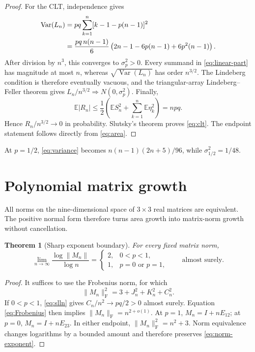 \documentclass[11pt,a4paper]{amsart}
\newtheorem{theorem}{Theorem}[section]
\theoremstyle{definition}
\theoremstyle{remark}
\newcommand{\Exp}{\mathbb E}
\newcommand{\norm}[1]{\lVert #1\rVert}
\begin{document}
\begin{proof}
For the CLT, independence gives
\begin{align}
 \operatorname{Var}(L_n)
 &=pq\sum_{k=1}^n[k-1-p(n-1)]^2\notag\\
 &=\frac{pq\,n(n-1)}6
 \left(2n-1-6p(n-1)+6p^2(n-1)\right).
 \label{eq:linear-variance}
\end{align}
After division by $n^3$, this converges to $\sigma_p^2>0$.  Every summand
in \eqref{eq:linear-part} has magnitude at most $n$, whereas
$\sqrt{\operatorname{Var}(L_n)}$ has order $n^{3/2}$.  The Lindeberg
condition is therefore eventually vacuous, and the triangular-array
Lindeberg--Feller theorem gives
$L_n/n^{3/2}\Longrightarrow N(0,\sigma_p^2)$.
Finally,
\[
 \Exp|R_n|
 \leq\frac12\left(
 \Exp S_n^2+\sum_{k=1}^n\Exp\eta_k^2\right)=npq.
\]
Hence $R_n/n^{3/2}\to0$ in probability.  Slutsky's theorem proves
\eqref{eq:clt}.  The endpoint statement follows directly from
\eqref{eq:area}.
\end{proof}

At $p=1/2$, \eqref{eq:variance} becomes
$n(n-1)(2n+5)/96$, while $\sigma_{1/2}^2=1/48$.

\section{Polynomial matrix growth}
\label{sec:growth}

All norms on the nine-dimensional space of $3\times3$ real matrices are
equivalent.  The positive normal form therefore turns area growth into
matrix-norm growth without cancellation.

\begin{theorem}[Sharp exponent boundary]
\label{thm:norm-boundary}
For every fixed matrix norm,
\begin{equation}\label{eq:norm-exponent}
 \lim_{n\to\infty}\frac{\log\norm{M_n}}{\log n}
 =\begin{cases}
 2,&0<p<1,\\
 1,&p=0\text{ or }p=1,
 \end{cases}
 \qquad\text{almost surely}.
\end{equation}
\end{theorem}

\begin{proof}
It suffices to use the Frobenius norm, for which
\begin{equation}\label{eq:Frobenius}
 \norm{M_n}_{\mathrm F}^2=3+J_n^2+K_n^2+C_n^2.
\end{equation}
If $0<p<1$, \eqref{eq:slln} gives
$C_n/n^2\to pq/2>0$ almost surely.  Equation \eqref{eq:Frobenius} then
implies $\norm{M_n}_{\mathrm F}=n^{2+o(1)}$.  At $p=1$,
$M_n=I+nE_{12}$; at $p=0$, $M_n=I+nE_{23}$.  In either endpoint,
$\norm{M_n}_{\mathrm F}^2=n^2+3$.  Norm equivalence changes logarithms by a
bounded amount and therefore preserves \eqref{eq:norm-exponent}.
\end{proof}
\end{document}
